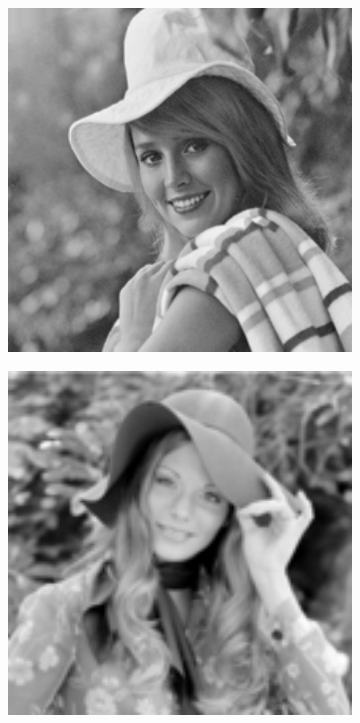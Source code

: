 \begin{figure}
\begin{subfigure}[b]{0.09\textwidth}
    \end{subfigure}
    \hfill
    \begin{subfigure}[b]{0.09\textwidth}
        \centering
        \includegraphics[width=1\textwidth]{images/pgpd/elaine.png}
    \end{subfigure}
    \hfill
    \begin{subfigure}[b]{0.09\textwidth}
        \centering
        \includegraphics[width=1\textwidth]{images/pgpd/hat.png}

\end{subfigure}
\end{figure}
